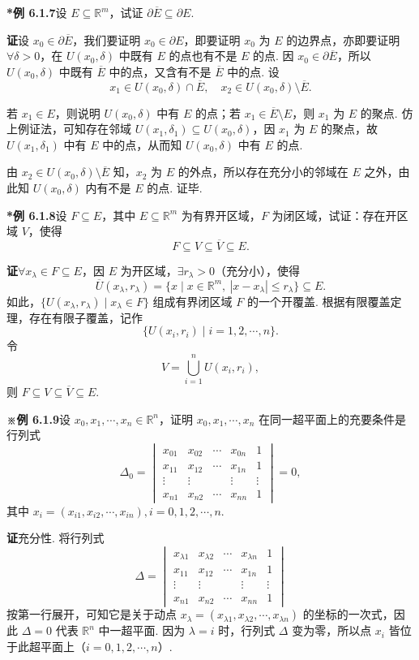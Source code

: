 \documentclass[UTF8, 12pt, fontset=fandol, oneside]{ctexart}
\begin{document}
\noindent\textbf{*例 6.1.7}\quad 设 $E\subseteq\mathbb{R}^m$，试证 $\partial\overline{E}\subseteq\partial E$.

\noindent\textbf{证}\quad 设 $x_0\in\partial\overline{E}$，我们要证明 $x_0\in\partial E$，即要证明 $x_0$ 为 $E$ 的边界点，亦即要证明 $\forall\delta>0$，在 $U(x_0,\delta)$ 中既有 $E$ 的点也有不是 $E$ 的点. 因 $x_0\in\partial\overline{E}$，所以 $U(x_0,\delta)$ 中既有 $\overline{E}$ 中的点，又含有不是 $\overline{E}$ 中的点. 设
\[
  x_1\in U(x_0,\delta)\cap\overline{E},\quad
  x_2\in U(x_0,\delta)\setminus\overline{E}.
\]

若 $x_1\in E$，则说明 $U(x_0,\delta)$ 中有 $E$ 的点；若 $x_1\in\overline{E}\setminus E$，则 $x_1$ 为 $E$ 的聚点. 仿上例证法，可知存在邻域 $U(x_1,\delta_1)\subseteq U(x_0,\delta)$，因 $x_1$ 为 $E$ 的聚点，故 $U(x_1,\delta_1)$ 中有 $E$ 中的点，从而知 $U(x_0,\delta)$ 中有 $E$ 的点.

由 $x_2\in U(x_0,\delta)\setminus\overline{E}$ 知，$x_2$ 为 $E$ 的外点，所以存在充分小的邻域在 $E$ 之外，由此知 $U(x_0,\delta)$ 内有不是 $E$ 的点. 证毕.

\noindent\textbf{*例 6.1.8}\quad 设 $F\subseteq E$，其中 $E\subseteq\mathbb{R}^m$ 为有界开区域，$F$ 为闭区域，试证：存在开区域 $V$，使得
\[
  F\subseteq V\subseteq\overline{V}\subseteq E.
\]

\noindent\textbf{证}\quad $\forall x_\lambda\in F\subseteq E$，因 $E$ 为开区域，$\exists r_\lambda>0$（充分小），使得
\[
  \overline{U}(x_\lambda,r_\lambda)
  =\{x\mid x\in\mathbb{R}^m,\ |x-x_\lambda|\le r_\lambda\}\subseteq E.
\]
如此，$\{U(x_\lambda,r_\lambda)\mid x_\lambda\in F\}$ 组成有界闭区域 $F$ 的一个开覆盖. 根据有限覆盖定理，存在有限子覆盖，记作
\[
  \{U(x_i,r_i)\mid i=1,2,\cdots,n\}.
\]
令
\[
  V=\bigcup_{i=1}^n U(x_i,r_i),
\]
则 $F\subseteq V\subseteq\overline{V}\subseteq E$.

\noindent\textbf{※例 6.1.9}\quad 设 $x_0,x_1,\cdots,x_n\in\mathbb{R}^n$，证明 $x_0,x_1,\cdots,x_n$ 在同一超平面上的充要条件是行列式
\[
  \Delta_0=
  \begin{vmatrix}
  x_{01}&x_{02}&\cdots&x_{0n}&1\\
  x_{11}&x_{12}&\cdots&x_{1n}&1\\
  \vdots&\vdots&&\vdots&\vdots\\
  x_{n1}&x_{n2}&\cdots&x_{nn}&1
  \end{vmatrix}=0,
\]
其中 $x_i=(x_{i1},x_{i2},\cdots,x_{in}),i=0,1,2,\cdots,n$.

\noindent\textbf{证}\quad 充分性. 将行列式
\[
  \Delta=
  \begin{vmatrix}
  x_{\lambda1}&x_{\lambda2}&\cdots&x_{\lambda n}&1\\
  x_{11}&x_{12}&\cdots&x_{1n}&1\\
  \vdots&\vdots&&\vdots&\vdots\\
  x_{n1}&x_{n2}&\cdots&x_{nn}&1
  \end{vmatrix}
\]
按第一行展开，可知它是关于动点 $x_\lambda=(x_{\lambda1},x_{\lambda2},\cdots,x_{\lambda n})$ 的坐标的一次式，因此 $\Delta=0$ 代表 $\mathbb{R}^n$ 中一超平面. 因为 $\lambda=i$ 时，行列式 $\Delta$ 变为零，所以点 $x_i$ 皆位于此超平面上（$i=0,1,2,\cdots,n$）.
\end{document}
